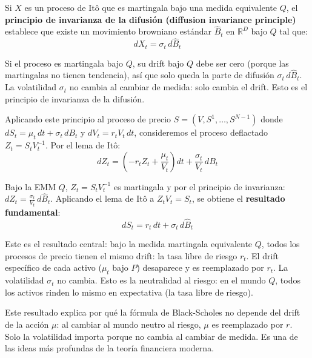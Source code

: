 \documentclass[12pt]{article}
\begin{document}
Si $X$ es un proceso de It\^o que es martingala bajo una medida equivalente $Q$, el \textbf{principio de invarianza de la difusi\'on (diffusion invariance principle)} establece que existe un movimiento browniano est\'andar $\hat{B}_t$ en $\mathbb{R}^D$ bajo $Q$ tal que:
\begin{equation}
  dX_t = \sigma_t \, d\hat{B}_t
\end{equation}

\begin{intuicionmat}
Si el proceso es martingala bajo $Q$, su drift bajo $Q$ debe ser cero (porque las martingalas no tienen tendencia), as\'i que solo queda la parte de difusi\'on $\sigma_t\,d\hat{B}_t$. La volatilidad $\sigma_t$ no cambia al cambiar de medida: solo cambia el drift. Esto es el principio de invarianza de la difusi\'on.
\end{intuicionmat}

Aplicando este principio al proceso de precio $S = (V, S^1, \ldots, S^{N-1})$ donde $dS_t = \mu_t\,dt + \sigma_t\,dB_t$ y $dV_t = r_t V_t\,dt$, consideremos el proceso deflactado $Z_t = S_t V_t^{-1}$. Por el lema de It\^o:
\begin{equation}
  dZ_t = \left(-r_t Z_t + \frac{\mu_t}{V_t}\right)dt + \frac{\sigma_t}{V_t}\,dB_t
\end{equation}

Bajo la EMM $Q$, $Z_t = S_t V_t^{-1}$ es martingala y por el principio de invarianza: $dZ_t = \frac{\sigma_t}{V_t}\,d\hat{B}_t$. Aplicando el lema de It\^o a $Z_t V_t = S_t$, se obtiene el \textbf{resultado fundamental}:
\begin{equation}
  dS_t = r_t \, dt + \sigma_t \, d\hat{B}_t
\end{equation}

\begin{intuicionmat}
Este es el resultado central: bajo la medida martingala equivalente $Q$, todos los procesos de precio tienen el mismo drift: la tasa libre de riesgo $r_t$. El drift espec\'ifico de cada activo ($\mu_t$ bajo $P$) desaparece y es reemplazado por $r_t$. La volatilidad $\sigma_t$ no cambia. Esto es la neutralidad al riesgo: en el mundo $Q$, todos los activos rinden lo mismo en expectativa (la tasa libre de riesgo).
\end{intuicionmat}

\begin{intuicion}
Este resultado explica por qu\'e la f\'ormula de Black-Scholes no depende del drift de la acci\'on $\mu$: al cambiar al mundo neutro al riesgo, $\mu$ es reemplazado por $r$. Solo la volatilidad importa porque no cambia al cambiar de medida. Es una de las ideas m\'as profundas de la teor\'ia financiera moderna.
\end{intuicion}
\end{document}
